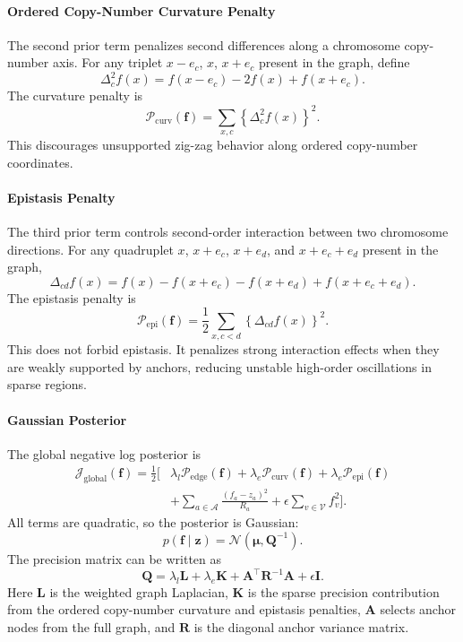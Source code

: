 \documentclass[11pt]{article}
\newcommand{\Normal}{\mathcal{N}}
\begin{document}
\paragraph{Ordered Copy-Number Curvature Penalty}

The second prior term penalizes second differences along a chromosome
copy-number axis. For any triplet $x-e_c$, $x$, $x+e_c$ present in the graph,
define
\[
  \Delta_c^2 f(x)
  =
  f(x-e_c)-2f(x)+f(x+e_c).
\]
The curvature penalty is
\[
  \mathcal{P}_{\mathrm{curv}}(\bm f)
  =
  \sum_{x,c}
  \left\{\Delta_c^2 f(x)\right\}^2.
\]
This discourages unsupported zig-zag behavior along ordered copy-number
coordinates.

\paragraph{Epistasis Penalty}

The third prior term controls second-order interaction between two chromosome
directions. For any quadruplet $x$, $x+e_c$, $x+e_d$, and $x+e_c+e_d$ present
in the graph,
\[
  \Delta_{cd} f(x)
  =
  f(x)-f(x+e_c)-f(x+e_d)+f(x+e_c+e_d).
\]
The epistasis penalty is
\[
  \mathcal{P}_{\mathrm{epi}}(\bm f)
  =
  \frac{1}{2}
  \sum_{x,c<d}
  \left\{\Delta_{cd}f(x)\right\}^2.
\]
This does not forbid epistasis. It penalizes strong interaction effects when
they are weakly supported by anchors, reducing unstable high-order oscillations
in sparse regions.

\paragraph{Gaussian Posterior}

The global negative log posterior is
\[
\begin{aligned}
  \mathcal{J}_{\mathrm{global}}(\bm f)
  =
  \frac{1}{2}
  \bigg[
  &\lambda_l\mathcal{P}_{\mathrm{edge}}(\bm f)
  +
  \lambda_e\mathcal{P}_{\mathrm{curv}}(\bm f)
  +
  \lambda_e\mathcal{P}_{\mathrm{epi}}(\bm f)\\
  &+
  \sum_{a\in\mathcal{A}}
  \frac{(f_a-z_a)^2}{R_a}
  +
  \epsilon\sum_{v\in\mathcal{V}}f_v^2
  \bigg].
\end{aligned}
\]
All terms are quadratic, so the posterior is Gaussian:
\[
  p(\bm f\mid \bm z)
  =
  \Normal(\bm \mu,\bm Q^{-1}).
\]
The precision matrix can be written as
\[
  \bm Q
  =
  \lambda_l\bm L
  +
  \lambda_e\bm K
  +
  \bm A^\top\bm R^{-1}\bm A
  +
  \epsilon\bm I.
\]
Here $\bm L$ is the weighted graph Laplacian, $\bm K$ is the sparse precision
contribution from the ordered copy-number curvature and epistasis penalties,
$\bm A$ selects anchor nodes from the full graph, and $\bm R$ is the diagonal
anchor variance matrix.
\end{document}
